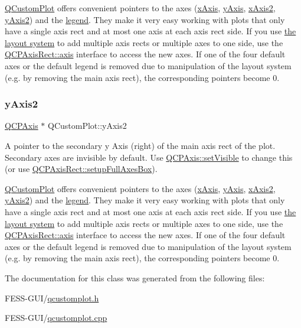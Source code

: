 \hyperlink{class_q_custom_plot}{Q\+Custom\+Plot} offers convenient pointers to the axes (\hyperlink{class_q_custom_plot_a9a79cd0158a4c7f30cbc702f0fd800e4}{x\+Axis}, \hyperlink{class_q_custom_plot_af6fea5679725b152c14facd920b19367}{y\+Axis}, \hyperlink{class_q_custom_plot_ada41599f22cad901c030f3dcbdd82fd9}{x\+Axis2}, \hyperlink{class_q_custom_plot_af13fdc5bce7d0fabd640f13ba805c0b7}{y\+Axis2}) and the \hyperlink{class_q_custom_plot_a4eadcd237dc6a09938b68b16877fa6af}{legend}. They make it very easy working with plots that only have a single axis rect and at most one axis at each axis rect side. If you use \hyperlink{}{the layout system} to add multiple axis rects or multiple axes to one side, use the \hyperlink{class_q_c_p_axis_rect_a583ae4f6d78b601b732183f6cabecbe1}{Q\+C\+P\+Axis\+Rect\+::axis} interface to access the new axes. If one of the four default axes or the default legend is removed due to manipulation of the layout system (e.\+g. by removing the main axis rect), the corresponding pointers become 0. \hypertarget{class_q_custom_plot_af13fdc5bce7d0fabd640f13ba805c0b7}{}\label{class_q_custom_plot_af13fdc5bce7d0fabd640f13ba805c0b7} 
\subsubsection{\texorpdfstring{y\+Axis2}{yAxis2}}
{\footnotesize\ttfamily \hyperlink{class_q_c_p_axis}{Q\+C\+P\+Axis} $\ast$ Q\+Custom\+Plot\+::y\+Axis2}

A pointer to the secondary y Axis (right) of the main axis rect of the plot. Secondary axes are invisible by default. Use \hyperlink{class_q_c_p_layerable_a3bed99ddc396b48ce3ebfdc0418744f8}{Q\+C\+P\+Axis\+::set\+Visible} to change this (or use \hyperlink{class_q_c_p_axis_rect_a5fa906175447b14206954f77fc7f1ef4}{Q\+C\+P\+Axis\+Rect\+::setup\+Full\+Axes\+Box}).

\hyperlink{class_q_custom_plot}{Q\+Custom\+Plot} offers convenient pointers to the axes (\hyperlink{class_q_custom_plot_a9a79cd0158a4c7f30cbc702f0fd800e4}{x\+Axis}, \hyperlink{class_q_custom_plot_af6fea5679725b152c14facd920b19367}{y\+Axis}, \hyperlink{class_q_custom_plot_ada41599f22cad901c030f3dcbdd82fd9}{x\+Axis2}, \hyperlink{class_q_custom_plot_af13fdc5bce7d0fabd640f13ba805c0b7}{y\+Axis2}) and the \hyperlink{class_q_custom_plot_a4eadcd237dc6a09938b68b16877fa6af}{legend}. They make it very easy working with plots that only have a single axis rect and at most one axis at each axis rect side. If you use \hyperlink{}{the layout system} to add multiple axis rects or multiple axes to one side, use the \hyperlink{class_q_c_p_axis_rect_a583ae4f6d78b601b732183f6cabecbe1}{Q\+C\+P\+Axis\+Rect\+::axis} interface to access the new axes. If one of the four default axes or the default legend is removed due to manipulation of the layout system (e.\+g. by removing the main axis rect), the corresponding pointers become 0. 

The documentation for this class was generated from the following files\+:\begin{DoxyCompactItemize}
\item 
F\+E\+S\+S-\/\+G\+U\+I/\hyperlink{qcustomplot_8h}{qcustomplot.\+h}\item 
F\+E\+S\+S-\/\+G\+U\+I/\hyperlink{qcustomplot_8cpp}{qcustomplot.\+cpp}\end{DoxyCompactItemize}
